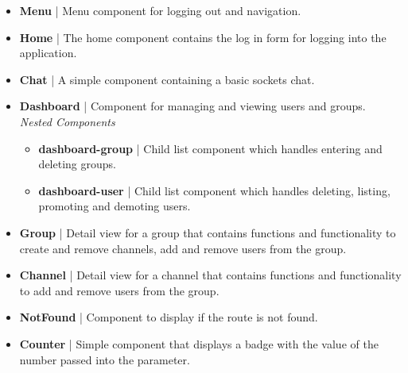 \documentclass[11pt, conference,letterpaper]{IEEEtran}
\begin{document}
\begin{itemize}
    \item \textbf{Menu} | Menu component for logging out and navigation.
    \item \textbf{Home} | The home component contains the log in form for logging into the application.
    \item \textbf{Chat} | A simple component containing a basic sockets chat.
    \item \textbf{Dashboard} | Component for managing and viewing users and groups.
    \\ \textit{Nested Components}
    \begin{itemize}
        \item \textbf{dashboard-group} | Child list component which handles entering and deleting groups.
        \item \textbf{dashboard-user}  | Child list component which handles deleting, listing, promoting and demoting users.
    \end{itemize}
    \item \textbf{Group} | Detail view for a group that contains functions and functionality to create and remove channels, add and remove users from the group.
    \item \textbf{Channel} | Detail view for a channel that contains functions and functionality to add and remove users from the group.
    \item \textbf{NotFound} | Component to display if the route is not found.
    \item \textbf{Counter} | Simple component that displays a badge with the value of the number passed into the parameter.
\end{itemize}
\end{document}
